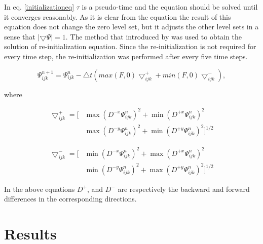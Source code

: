 \documentclass[letterpaper,10pt]{article}
\begin{document}
In eq. \eqref{initializationeq} $\tau$ is a pseudo-time and the equation should be solved until it converges reasonably. 
As it is clear from the equation the result of this equation does not change the zero level set, but it adjusts the other level sets 
in a sense that $|\bigtriangledown \varPsi|=1$.
The method that introduced by \cite{Adalsteinsson1999} was used to obtain the solution of re-initialization equation. Since the re-initialization 
is not required for every time step, the re-initialization was performed after every five time steps.

\begin{equation}
	\varPsi_{ijk}^{n+1}=\varPsi_{ijk}^{n}-\bigtriangleup t \left(max(F,0)\bigtriangledown_{ijk}^{+}+min(F,0)\bigtriangledown_{ijk}^{-} \right),
\end{equation}

where 

\begin{equation}
	\begin{aligned}
		\bigtriangledown_{ijk}^{+} = \big[ & \max(D^{-x}\varPsi_{ijk}^{n})^2 + \min(D^{+x}\varPsi_{ijk}^{n})^2
		\\& \max(D^{-y}\varPsi_{ijk}^{n})^2 + \min(D^{+y}\varPsi_{ijk}^{n})^2 \big]^{1/2}
	\end{aligned}
\end{equation}
 
\begin{equation}
	\begin{aligned}
		\bigtriangledown_{ijk}^{-} = \big[ & \min(D^{-x}\varPsi_{ijk}^{n})^2 + \max(D^{+x}\varPsi_{ijk}^{n})^2
		\\& \min(D^{-y}\varPsi_{ijk}^{n})^2 + \max(D^{+y}\varPsi_{ijk}^{n})^2 \big]^{1/2}
	\end{aligned}
\end{equation} 

In the above equations $D^+$, and $D^-$ are  respectively the backward and forward differences in the corresponding directions.


\section{Results} \label{results}
\end{document}

